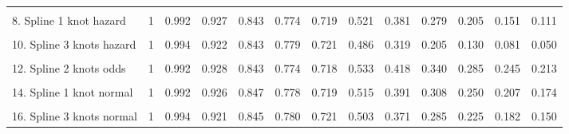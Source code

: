 \documentclass[
]{article}
\begin{document}
{\begin{tabular}{lrrrrrrrrrrrr}
\cellcolor{gray!6}{7. Generalised Gamma} & \cellcolor{gray!6}{1} & \cellcolor{gray!6}{0.991} & \cellcolor{gray!6}{0.928} & \cellcolor{gray!6}{0.849} & \cellcolor{gray!6}{0.778} & \cellcolor{gray!6}{0.717} & \cellcolor{gray!6}{0.526} & \cellcolor{gray!6}{0.425} & \cellcolor{gray!6}{0.362} & \cellcolor{gray!6}{0.319} & \cellcolor{gray!6}{0.286} & \cellcolor{gray!6}{0.261}\\
8. Spline 1 knot hazard & 1 & 0.992 & 0.927 & 0.843 & 0.774 & 0.719 & 0.521 & 0.381 & 0.279 & 0.205 & 0.151 & 0.111\\
\cellcolor{gray!6}{9. Spline 2 knots hazard} & \cellcolor{gray!6}{1} & \cellcolor{gray!6}{0.992} & \cellcolor{gray!6}{0.928} & \cellcolor{gray!6}{0.843} & \cellcolor{gray!6}{0.774} & \cellcolor{gray!6}{0.719} & \cellcolor{gray!6}{0.523} & \cellcolor{gray!6}{0.384} & \cellcolor{gray!6}{0.283} & \cellcolor{gray!6}{0.210} & \cellcolor{gray!6}{0.156} & \cellcolor{gray!6}{0.116}\\
10. Spline 3 knots hazard & 1 & 0.994 & 0.922 & 0.843 & 0.779 & 0.721 & 0.486 & 0.319 & 0.205 & 0.130 & 0.081 & 0.050\\
\cellcolor{gray!6}{11. Spline 1 knot odds} & \cellcolor{gray!6}{1} & \cellcolor{gray!6}{0.992} & \cellcolor{gray!6}{0.927} & \cellcolor{gray!6}{0.843} & \cellcolor{gray!6}{0.774} & \cellcolor{gray!6}{0.718} & \cellcolor{gray!6}{0.532} & \cellcolor{gray!6}{0.415} & \cellcolor{gray!6}{0.338} & \cellcolor{gray!6}{0.283} & \cellcolor{gray!6}{0.242} & \cellcolor{gray!6}{0.211}\\
12. Spline 2 knots odds & 1 & 0.992 & 0.928 & 0.843 & 0.774 & 0.718 & 0.533 & 0.418 & 0.340 & 0.285 & 0.245 & 0.213\\
\cellcolor{gray!6}{13. Spline 3 knots odds} & \cellcolor{gray!6}{1} & \cellcolor{gray!6}{0.994} & \cellcolor{gray!6}{0.922} & \cellcolor{gray!6}{0.844} & \cellcolor{gray!6}{0.780} & \cellcolor{gray!6}{0.721} & \cellcolor{gray!6}{0.498} & \cellcolor{gray!6}{0.363} & \cellcolor{gray!6}{0.277} & \cellcolor{gray!6}{0.220} & \cellcolor{gray!6}{0.180} & \cellcolor{gray!6}{0.151}\\
14. Spline 1 knot normal & 1 & 0.992 & 0.926 & 0.847 & 0.778 & 0.719 & 0.515 & 0.391 & 0.308 & 0.250 & 0.207 & 0.174\\
\cellcolor{gray!6}{15. Spline 2 knots normal} & \cellcolor{gray!6}{1} & \cellcolor{gray!6}{0.992} & \cellcolor{gray!6}{0.929} & \cellcolor{gray!6}{0.842} & \cellcolor{gray!6}{0.773} & \cellcolor{gray!6}{0.718} & \cellcolor{gray!6}{0.538} & \cellcolor{gray!6}{0.426} & \cellcolor{gray!6}{0.350} & \cellcolor{gray!6}{0.295} & \cellcolor{gray!6}{0.253} & \cellcolor{gray!6}{0.220}\\
16. Spline 3 knots normal & 1 & 0.994 & 0.921 & 0.845 & 0.780 & 0.721 & 0.503 & 0.371 & 0.285 & 0.225 & 0.182 & 0.150\\
\bottomrule
\end{tabular}}
\end{document}
